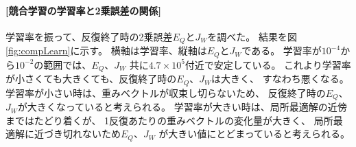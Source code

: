 \documentclass[a4j]{jarticle}
\begin{document}
\paragraph{[競合学習の学習率と2乗誤差の関係]}

学習率を振って、反復終了時の2乗誤差$E_Q$と$J_W$を調べた。
結果を図\ref{fig:compLearn}に示す。
横軸は学習率、縦軸は$E_Q$と$J_W$である。
学習率が$10^{-4}$から$10^{-2}$の範囲では、$E_Q$、$J_W$
共に$4.7\times 10^5$付近で安定している。
これより学習率が小さくても大きくても、反復終了時の$E_Q$、$J_W$は大きく、
すなわち悪くなる。
学習率が小さい時は、重みベクトルが収束し切らないため、
反復終了時の$E_Q$、$J_W$が大きくなっていると考えられる。
学習率が大きい時は、局所最適解の近傍まではたどり着くが、
1反復あたりの重みベクトルの変化量が大きく、
局所最適解に近づき切れないため$E_Q$、$J_W$
が大きい値にとどまっていると考えられる。
\end{document}
